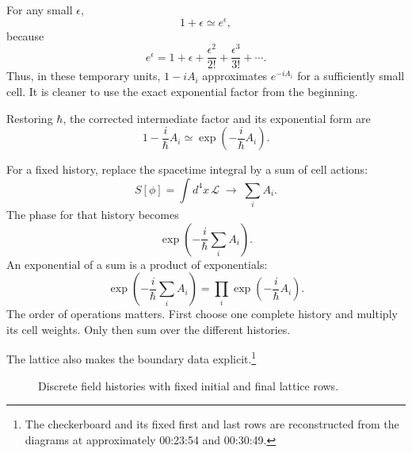For any small \(\epsilon\),
\begin{equation}
1+\epsilon\simeq e^\epsilon,
\end{equation}
because
\begin{equation}
e^\epsilon
=1+\epsilon+\frac{\epsilon^2}{2!}
+\frac{\epsilon^3}{3!}+\cdots.
\end{equation}
Thus, in these temporary units, \(1-iA_i\) approximates \(e^{-iA_i}\) for a sufficiently small cell. It is cleaner to use the exact exponential factor from the beginning.

\begin{classroomqa}
\end{classroomqa}

Restoring \(\hbar\), the corrected intermediate factor and its exponential form are
\begin{equation}
1-\frac{i}{\hbar}A_i
\simeq
\exp\!\left(-\frac{i}{\hbar}A_i\right).
\end{equation}

For a fixed history, replace the spacetime integral by a sum of cell actions:
\begin{equation}
S[\phi]
=\int d^4x\,\mathcal{L}
\;\longrightarrow\;
\sum_i A_i.
\end{equation}
The phase for that history becomes
\begin{equation}
\exp\!\left(-\frac{i}{\hbar}\sum_i A_i\right).
\end{equation}
An exponential of a sum is a product of exponentials:
\begin{equation}
\exp\!\left(-\frac{i}{\hbar}\sum_i A_i\right)
=
\prod_i\exp\!\left(-\frac{i}{\hbar}A_i\right).
\end{equation}
The order of operations matters. First choose one complete history and multiply its cell weights. Only then sum over the different histories.

The lattice also makes the boundary data explicit.\footnote{The checkerboard and its fixed first and last rows are reconstructed from the diagrams at approximately 00:23:54 and 00:30:49.}
\begin{figure}[htbp]
\centering
{}
\caption{Discrete field histories with fixed initial and final lattice rows.}
\end{figure}

